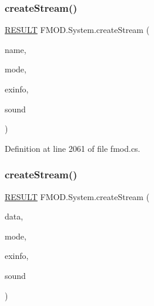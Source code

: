 \mbox{\label{class_f_m_o_d_1_1_system_ab73abb383bc14099bacb426865473940}} 
\subsubsection{\texorpdfstring{create\+Stream()}{createStream()}\hspace{0.1cm}{\footnotesize\ttfamily [1/3]}}
{\footnotesize\ttfamily \hyperlink{namespace_f_m_o_d_a305d1176ef3f8c8815861a60407ac33d}{R\+E\+S\+U\+LT} F\+M\+O\+D.\+System.\+create\+Stream (\begin{DoxyParamCaption}\item[{string}]{name,  }\item[{\hyperlink{namespace_f_m_o_d_a94ab158a8314f5f4248f1aea55dbefa3}{M\+O\+DE}}]{mode,  }\item[{ref \hyperlink{struct_f_m_o_d_1_1_c_r_e_a_t_e_s_o_u_n_d_e_x_i_n_f_o}{C\+R\+E\+A\+T\+E\+S\+O\+U\+N\+D\+E\+X\+I\+N\+FO}}]{exinfo,  }\item[{out \hyperlink{class_f_m_o_d_1_1_sound}{Sound}}]{sound }\end{DoxyParamCaption})}



Definition at line 2061 of file fmod.\+cs.

\mbox{\label{class_f_m_o_d_1_1_system_a3c57d0bd3350178eb16bfc5bc818a587}} 
\subsubsection{\texorpdfstring{create\+Stream()}{createStream()}\hspace{0.1cm}{\footnotesize\ttfamily [2/3]}}
{\footnotesize\ttfamily \hyperlink{namespace_f_m_o_d_a305d1176ef3f8c8815861a60407ac33d}{R\+E\+S\+U\+LT} F\+M\+O\+D.\+System.\+create\+Stream (\begin{DoxyParamCaption}\item[{byte \mbox{[}$\,$\mbox{]}}]{data,  }\item[{\hyperlink{namespace_f_m_o_d_a94ab158a8314f5f4248f1aea55dbefa3}{M\+O\+DE}}]{mode,  }\item[{ref \hyperlink{struct_f_m_o_d_1_1_c_r_e_a_t_e_s_o_u_n_d_e_x_i_n_f_o}{C\+R\+E\+A\+T\+E\+S\+O\+U\+N\+D\+E\+X\+I\+N\+FO}}]{exinfo,  }\item[{out \hyperlink{class_f_m_o_d_1_1_sound}{Sound}}]{sound }\end{DoxyParamCaption})}



